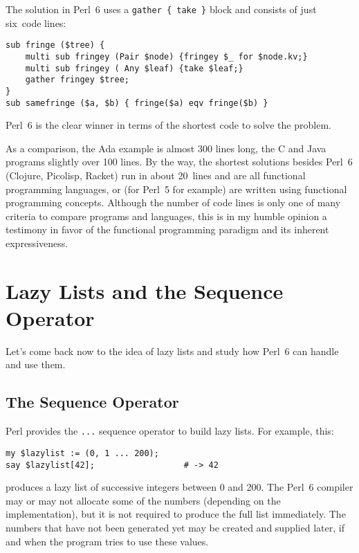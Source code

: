 The solution in Perl~6 uses a \verb'gather { take }' 
block and consists of just six~code lines:

\begin{verbatim}
sub fringe ($tree) {
    multi sub fringey (Pair $node) {fringey $_ for $node.kv;}
    multi sub fringey ( Any $leaf) {take $leaf;}
    gather fringey $tree;
}
sub samefringe ($a, $b) { fringe($a) eqv fringe($b) }
\end{verbatim}

Perl~6 is the clear winner in terms of the shortest code to 
solve the problem.

As a comparison, the Ada example is almost 300 lines long, 
the C and Java programs slightly over 100 lines. By the way, 
the shortest solutions besides Perl~6 (Clojure, Picolisp, 
Racket) run in about 20~lines and are all functional 
programming languages, or (for Perl~5 for example) are 
written using functional programming concepts. 
Although the number of code lines is only one of many 
criteria to compare programs and languages, this is 
in my humble opinion a testimony in favor of the functional 
programming paradigm and its inherent expressiveness.


\section{Lazy Lists and the Sequence Operator}

Let's come back now to the idea of lazy lists and study 
how Perl~6 can handle and use them.

\subsection{The Sequence Operator}

Perl provides the \verb'...' sequence operator to build 
lazy lists. For example, this:

\begin{verbatim}
my $lazylist := (0, 1 ... 200);
say $lazylist[42];                  # -> 42
\end{verbatim}

produces a lazy list of successive integers between 0 and 200. 
The Perl~6 compiler may or may not allocate some of the numbers
(depending on the implementation), but it is not required to 
produce the full list immediately. The numbers that have not 
been generated yet may be created and supplied later, if and when 
the program tries to use these values. 

